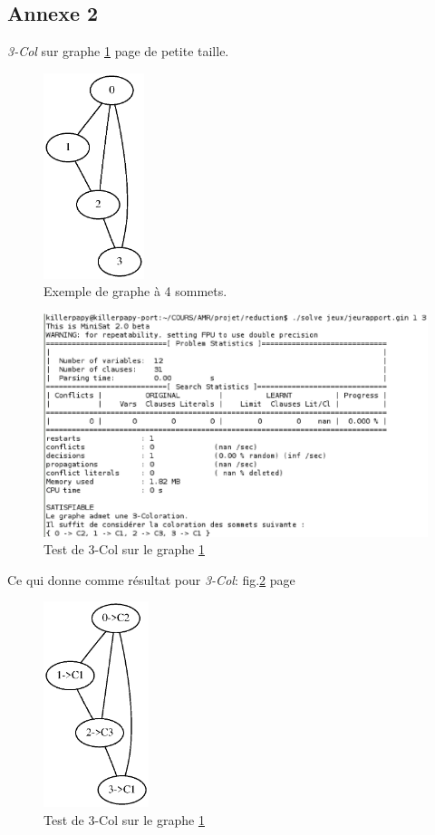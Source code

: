   \subsection{Annexe 2 \label{an2}}
  \emph{3-Col} sur graphe \ref{graphe} page \pageref{graphe} de petite
  taille.
  \begin{figure}[!ht]
   \begin{center}
    \includegraphics[height=6cm]{images/jeurap.ps}
    \caption{Exemple de graphe à 4 sommets.\label{graphe}}
   \end{center}
  \end{figure}
  
  \begin{figure}[!ht]
   \begin{center}
    \includegraphics[width=12cm]{images/3-Col.eps}
    \caption{Test de 3-Col sur le graphe \ref{graphe}}
   \end{center}
  \end{figure}
  
  Ce qui donne comme résultat pour \emph{3-Col}: fig.\ref{result} page
  \pageref{result}
  \begin{figure}[!ht]
   \begin{center}
    \includegraphics[height=6cm]{images/jeurapport.ps}
    \caption{Test de 3-Col sur le graphe \ref{graphe} \label{result}}
   \end{center}
  \end{figure}

